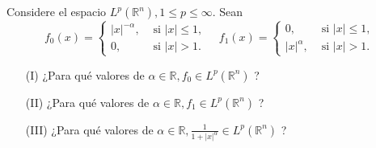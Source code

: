   Considere el espacio $L^p\left(\mathbb{R}^n\right), 1 \leq p \leq \infty$. Sean
$$
f_0(x)=\left\{\begin{array}{ll}
|x|^{-\alpha}, & \text { si }|x| \leq 1, \\
0, & \text { si }|x|>1 .
\end{array} \quad f_1(x)= \begin{cases}0, & \text { si }|x| \leq 1, \\
|x|^\alpha, & \text { si }|x|>1 .\end{cases}\right.
$$
\begin{itemize}
  \item[(I)] ¿Para qué valores de $\alpha \in \mathbb{R}, f_0 \in L^p\left(\mathbb{R}^n\right)$ ?
\item[(II)] ¿Para qué valores de $\alpha \in \mathbb{R}, f_1 \in L^p\left(\mathbb{R}^n\right)$ ?
\item[(III)] ¿Para qué valores de $\alpha \in \mathbb{R}, \frac{1}{1+|x|^\alpha} \in L^p\left(\mathbb{R}^n\right)$ ?
\end{itemize}

